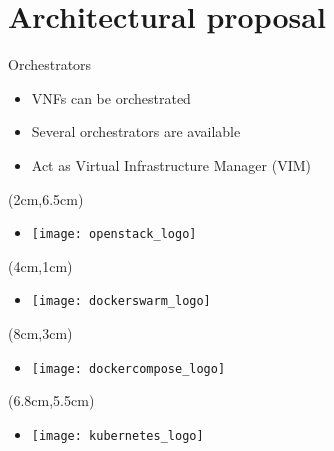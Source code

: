 \section{Architectural proposal}
\begin{frame}{Orchestrators}
  \begin{itemize}
  \item<1-> VNFs can be orchestrated
  \item<2-> Several orchestrators are available
  \item<7-> Act as Virtual Infrastructure Manager (VIM)
  \end{itemize}

  \begin{textblock*}{5cm}(2cm,6.5cm)
    \begin{itemize}
    \item[]<3-> \texttt{[image: openstack\_logo]}
    \end{itemize}
  \end{textblock*}

  \begin{textblock*}{5cm}(4cm,1cm)
    \begin{itemize}
    \item[]<4-> \texttt{[image: dockerswarm\_logo]}
    \end{itemize}
  \end{textblock*}

  \begin{textblock*}{5cm}(8cm,3cm)
    \begin{itemize}
    \item[]<5-> \texttt{[image: dockercompose\_logo]}
    \end{itemize}
  \end{textblock*}

  \begin{textblock*}{5cm}(6.8cm,5.5cm)
    \begin{itemize}
    \item[]<6-> \texttt{[image: kubernetes\_logo]}
    \end{itemize}
  \end{textblock*}
\end{frame}

